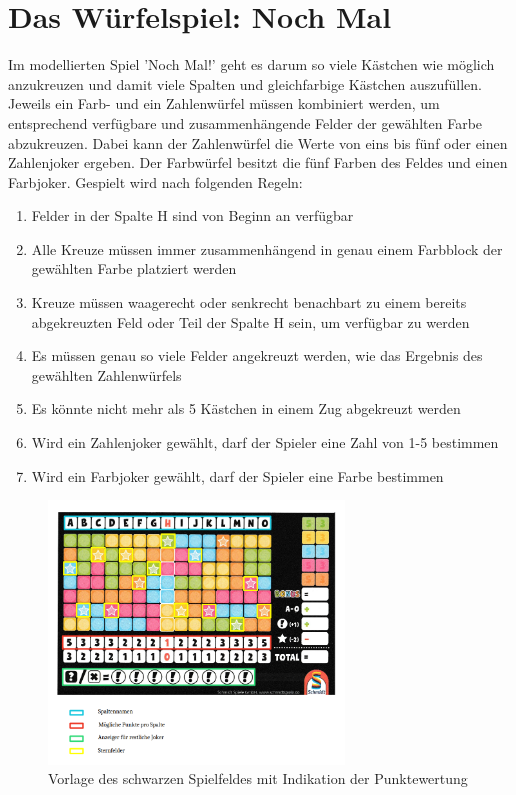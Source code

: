 \newpage
\section{Das Würfelspiel: Noch Mal}
Im modellierten Spiel 'Noch Mal!' geht es darum so viele Kästchen wie möglich anzukreuzen und damit viele Spalten und gleichfarbige Kästchen auszufüllen. Jeweils ein Farb- und ein Zahlenwürfel müssen kombiniert werden, um entsprechend verfügbare und zusammenhängende Felder der gewählten Farbe abzukreuzen. Dabei kann der Zahlenwürfel die Werte von eins bis fünf oder einen Zahlenjoker ergeben. Der Farbwürfel besitzt die fünf Farben des Feldes und einen Farbjoker. Gespielt wird nach folgenden Regeln:
\begin{enumerate}
    \item Felder in der Spalte H sind von Beginn an verfügbar
    \item Alle Kreuze müssen immer zusammenhängend in genau einem Farbblock der gewählten Farbe platziert werden
    \item Kreuze müssen waagerecht oder senkrecht benachbart zu einem bereits abgekreuzten Feld oder Teil der Spalte H sein, um verfügbar zu werden
    \item Es müssen genau so viele Felder angekreuzt werden, wie das Ergebnis des gewählten Zahlenwürfels
    \item Es könnte nicht mehr als 5 Kästchen in einem Zug abgekreuzt werden
    \item Wird ein Zahlenjoker gewählt, darf der Spieler eine Zahl von 1-5 bestimmen
    \item Wird ein Farbjoker gewählt, darf der Spieler eine Farbe bestimmen
\end{enumerate}

\begin{figure}[!h]
	\centering
	\includegraphics[width=0.7\textwidth]{Bilder/Abbildung2.png}
	\caption{Vorlage des schwarzen Spielfeldes mit Indikation der Punktewertung 
	\cite{schmidt_spiele_gmbh_spielregeln_nodate}}
	\label{fig:Vorlage}
\end{figure}

